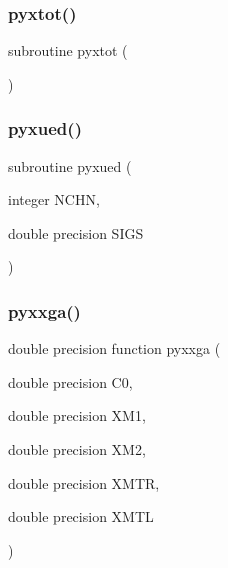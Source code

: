 \mbox{\label{pythia-6_84_824_8f_aefa74679a96bc60a9275508c987b41ee}} 
\subsubsection{\texorpdfstring{pyxtot()}{pyxtot()}}
{\footnotesize\ttfamily subroutine pyxtot (\begin{DoxyParamCaption}{ }\end{DoxyParamCaption})}

\mbox{\label{pythia-6_84_824_8f_a6934d9dda7d346e7f4173dcf9566e12d}} 
\subsubsection{\texorpdfstring{pyxued()}{pyxued()}}
{\footnotesize\ttfamily subroutine pyxued (\begin{DoxyParamCaption}\item[{integer}]{N\+C\+HN,  }\item[{double precision}]{S\+I\+GS }\end{DoxyParamCaption})}

\mbox{\label{pythia-6_84_824_8f_aa378166597fcb20d89584665eaf754c5}} 
\subsubsection{\texorpdfstring{pyxxga()}{pyxxga()}}
{\footnotesize\ttfamily double precision function pyxxga (\begin{DoxyParamCaption}\item[{double precision}]{C0,  }\item[{double precision}]{X\+M1,  }\item[{double precision}]{X\+M2,  }\item[{double precision}]{X\+M\+TR,  }\item[{double precision}]{X\+M\+TL }\end{DoxyParamCaption})}

